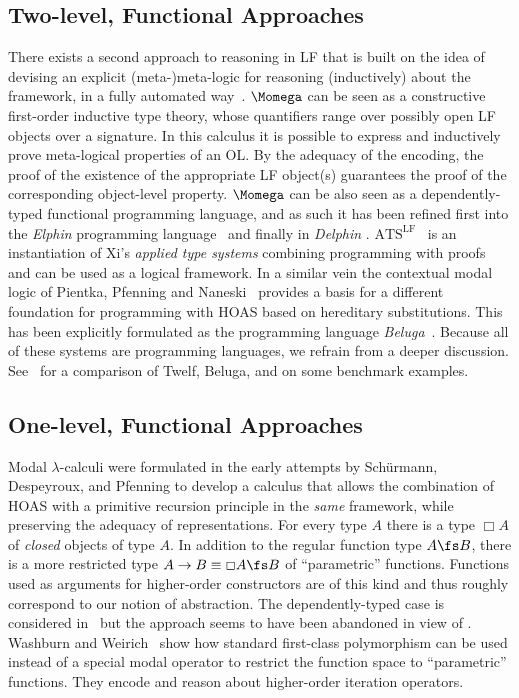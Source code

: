 \documentclass[final]{svjour3}
\begin{document}
\subsection{Two-level, Functional Approaches}
\label{ssec:2lf}



There exists a second approach to reasoning in LF that is built on the
idea of devising an explicit (meta-)meta-logic for reasoning
(inductively) about the framework, in a fully automated
way~\cite{S00}.  $\Momega$ can be seen as a constructive first-order
inductive type theory, whose quantifiers range over possibly open LF
objects over a signature.  In this calculus it is possible to express
and inductively prove meta-logical properties of an OL\@.  By
the adequacy of the encoding, the proof of the existence of the
appropriate LF object(s) guarantees the proof of the corresponding
object-level property.  $\Momega$ can be also seen as a
dependently-typed functional programming language, and as such it has
been refined first into the \emph{Elphin} programming
language~\cite{SPS:TLCA2005} and finally in \emph{Delphin}
\cite{PosSch08}. 
 $\mathrm{ATS^{LF}}$~\cite{CuiDX05} is an instantiation of Xi's
\emph{applied type systems} combining programming with proofs and can
be used as a logical framework.  In a similar vein the contextual
modal logic of Pientka, Pfenning and Naneski~\cite{NanevskiTOCL}
provides a basis for a different foundation for programming with HOAS
based on hereditary substitutions. This has been explicitly formulated
as the programming language \emph{Beluga}~\cite{Pientka10}. Because
all of these systems are programming languages, we refrain from a
deeper discussion.  See~\cite{FeltyPientka:ITP10} for a
comparison of Twelf, Beluga, and \hybrid on some benchmark examples.

\subsection{One-level, Functional Approaches}
\label{ssec:1lf}


Modal $\lambda$-calculi were formulated in the early attempts by
Sch\"{u}rmann, Despeyroux, and Pfenning \cite{SchurmannDP01} to
develop a calculus that allows the combination of HOAS with a
primitive recursion principle in the \emph{same} framework, while preserving
the adequacy of representations.
For every type $A$ there is a type $\Box A$ of {\em closed\/} objects
of type $A$.  In addition to the regular function type $A\fs B$, there
is a more restricted type $A \to B \equiv \Box A \fs B$ of
``parametric'' functions.  Functions used as arguments for
higher-order constructors are of this kind and thus roughly correspond
to our notion of abstraction.
The dependently-typed case is considered
in~\cite{Despeyroux00jflp} but the approach seems to have been abandoned
in view of \cite{NanevskiTOCL}.
Washburn and Weirich~\cite{WashburnWeirichJFP08} show how standard
first-class polymorphism can be used instead of a special modal
operator to restrict the function space to ``parametric'' functions.
They encode and reason about higher-order iteration operators.
\end{document}
